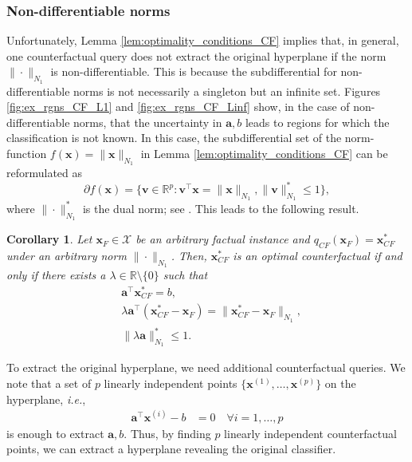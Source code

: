 \documentclass{article}
\newtheorem{corollary}[theorem]{Corollary}
\begin{document}
\subsubsection{Non-differentiable norms}
Unfortunately, Lemma \ref{lem:optimality_conditions_CF}  implies that, in general, one counterfactual query does not extract the original hyperplane if the norm $\|\cdot\|_{N_1}$ is non-differentiable. This is because the subdifferential for non-differentiable norms is not necessarily a singleton but an infinite set. Figures \ref{fig:ex_rgns_CF_L1} and \ref{fig:ex_rgns_CF_Linf} show, in the case of non-differentiable norms, that the uncertainty in $\bm{a},b$ leads to regions for which the classification is not known.
In this case, the subdifferential set of the norm-function $f(\bm{x})=\|\bm{x}\|_{N_1}$ in Lemma \ref{lem:optimality_conditions_CF} can be reformulated as
\begin{equation*}\label{eq:reformulation_subdifferentiable_norm}
    \partial  f(\bm{x}) = \{ \bm{v}\in \mathbb R^p: \bm{v}^\top \bm{x} = \|\bm{x}\|_{N_1} , \|\bm{v}\|_{N_1}^* \le 1\},
\end{equation*}
where $\| \cdot \|_{N_1}^*$ is the dual norm; see \cite{rockafellar1997convex}. This leads to the following result. 
\begin{corollary}
\label{cor:optimality_conditions_CF_non_differentiable_norm}
Let $\bm{x}_F\in \mathcal X$ be an arbitrary factual instance and $q_{CF}(\bm{x}_F) = \bm{x}_{CF}^*$ under an arbitrary norm $ \| \cdot \|_{N_1}$.  Then, $\bm{x}_{CF}^*$ is an optimal counterfactual if and only if there exists a $\lambda\in\mathbb R\setminus \{ 0\}$ such that
\begin{align*}
    &\bm{a}^\top \bm{x}_{CF}^* = b, \\
    &  \lambda \bm{a}^\top (\bm{x}_{CF}^* - \bm{x}_F) = \|\bm{x}_{CF}^* - \bm{x}_F\|_{N_1}, \\
    & \|\lambda \bm{a} \|_{N_1}^* \le 1 .
\end{align*}    
\end{corollary}
 To extract the original hyperplane, we need additional counterfactual queries. We note that a set of $p$ linearly independent points $\{\bm{x}^{(1)},\hdots, \bm{x}^{(p)}\}$ on the hyperplane, \textit{i.e.},
\begin{align}\label{eq:syst_eq_CF}
\bm{a}^\top \bm{x}^{(i)} - b & = 0 \quad \forall i=1,\ldots, p
\end{align}
is enough to extract $\bm{a},b$. Thus, by finding $p$ linearly independent counterfactual points, we can extract a hyperplane revealing the original classifier. 
\end{document}
